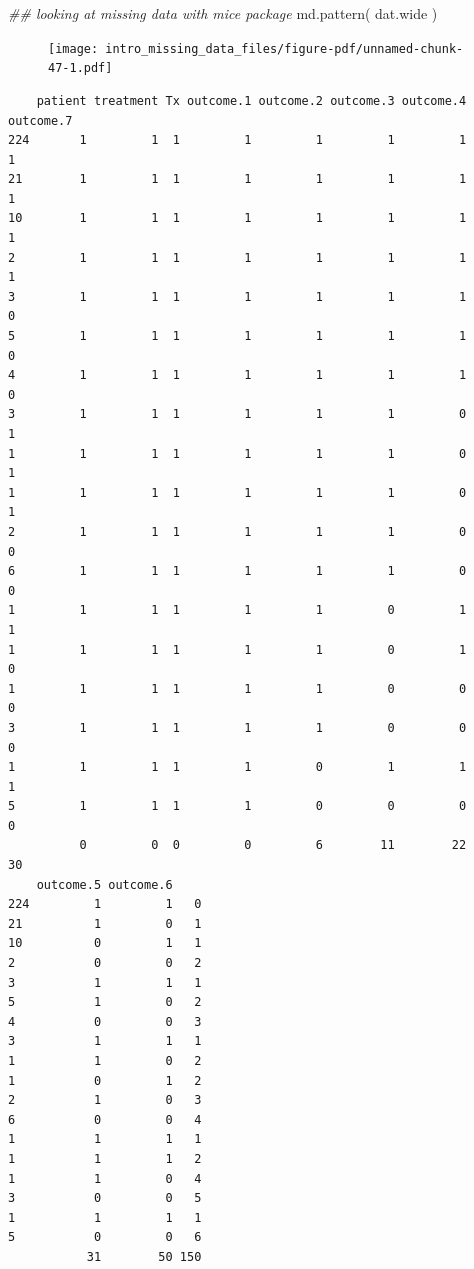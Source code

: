 \documentclass[
  letterpaper,
  DIV=11,
  numbers=noendperiod]{scrreprt}
\newenvironment{Shaded}{\begin{snugshade}}{\end{snugshade}}
\newcommand{\DocumentationTok}[1]{\textcolor[rgb]{0.73,0.13,0.13}{\textit{#1}}}
\newcommand{\FunctionTok}[1]{\textcolor[rgb]{0.02,0.16,0.49}{#1}}
\newcommand{\NormalTok}[1]{\textcolor[rgb]{0.00,0.44,0.13}{#1}}
\begin{document}
\begin{Shaded}
\begin{Highlighting}[]
\DocumentationTok{\#\# looking at missing data with mice package}
  \FunctionTok{md.pattern}\NormalTok{( dat.wide )}
\end{Highlighting}
\end{Shaded}

\begin{figure}[H]

{\centering \texttt{[image: intro\_missing\_data\_files/figure-pdf/unnamed-chunk-47-1.pdf]}

}

\end{figure}

\begin{verbatim}
    patient treatment Tx outcome.1 outcome.2 outcome.3 outcome.4 outcome.7
224       1         1  1         1         1         1         1         1
21        1         1  1         1         1         1         1         1
10        1         1  1         1         1         1         1         1
2         1         1  1         1         1         1         1         1
3         1         1  1         1         1         1         1         0
5         1         1  1         1         1         1         1         0
4         1         1  1         1         1         1         1         0
3         1         1  1         1         1         1         0         1
1         1         1  1         1         1         1         0         1
1         1         1  1         1         1         1         0         1
2         1         1  1         1         1         1         0         0
6         1         1  1         1         1         1         0         0
1         1         1  1         1         1         0         1         1
1         1         1  1         1         1         0         1         0
1         1         1  1         1         1         0         0         0
3         1         1  1         1         1         0         0         0
1         1         1  1         1         0         1         1         1
5         1         1  1         1         0         0         0         0
          0         0  0         0         6        11        22        30
    outcome.5 outcome.6    
224         1         1   0
21          1         0   1
10          0         1   1
2           0         0   2
3           1         1   1
5           1         0   2
4           0         0   3
3           1         1   1
1           1         0   2
1           0         1   2
2           1         0   3
6           0         0   4
1           1         1   1
1           1         1   2
1           1         0   4
3           0         0   5
1           1         1   1
5           0         0   6
           31        50 150
\end{verbatim}
\end{document}
